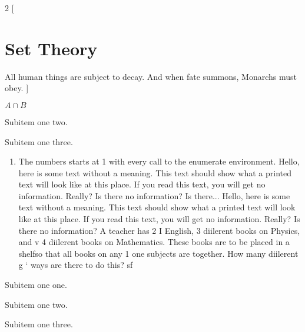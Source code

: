 \documentclass[14pt]{article}
\begin{document}
\begin{multicols}{2}
[
\section{Set Theory}
All human things are subject to decay. And when fate summons, Monarchs must obey.
]
\noindent
 \begin{inparaenum}[(1)]
    \item $ A\cap B$
     \item Subitem one two.
     \item Subitem one three.
   \end{inparaenum}

\begin{enumerate}
  \item The numbers starts at 1 with every call to the enumerate environment.
Hello, here is some text without a meaning.  This text should show what 
a printed text will look like at this place.
If you read this text, you will get no information.  Really?  Is there 
no information?  Is there...
Hello, here is some text without a meaning.  This text should show what 
a printed text will look like at this place.
If you read this text, you will get no information.  Really?  Is there 
no information? A teacher has 2
I English, 3 diilerent books on Physics, and
v 4 diilerent books on Mathematics. These books
are to be placed in a shelfso that all books on any
1 one subjects are together. How many diilerent
g ‘ ways are there to do this? sf
\end{enumerate}
  \begin{inparaenum}[(1)]
     \item Subitem one one.
     \item Subitem one two.
     \item Subitem one three.
   \end{inparaenum}
\end{multicols}
 
\end{document}
